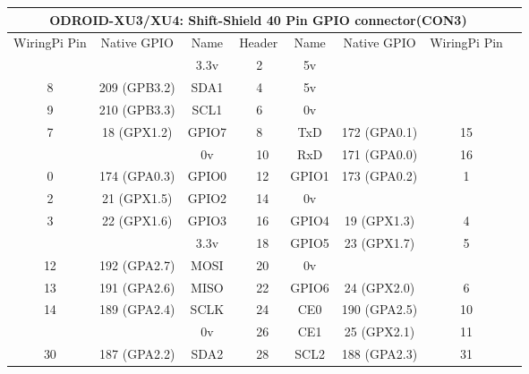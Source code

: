 \documentclass[11pt,a4paper]{article}
\begin{document}
\begin{sffamily}
\begin{center}
\begin{tabular}{|c|c|c||p{8mm}|p{8mm}||c|c|c|c|}
\hline
\multicolumn{8}{|c|}{\bfseries{ODROID-XU3/XU4: Shift-Shield 40 Pin GPIO connector(CON3)}}\\
\hline
\hline
WiringPi Pin	& Native GPIO	& Name	& \multicolumn{2}{|c||}{Header}	& Name	& Native GPIO	& WiringPi Pin\\
\hline
\hline
	& 		& \textcolor{rtb-red}{3.3v}	& \raggedleft{1} &  2 & \textcolor{rtb-maroon}{5v}	& 		& \\
\hline
8	& 209 (GPB3.2)		& \textcolor{rtb-aqua}{SDA1}	& \raggedleft{3} &  4 & \textcolor{rtb-maroon}{5v}		& 				& \\
\hline
9	& 210 (GPB3.3)		& \textcolor{rtb-aqua}{SCL1}	& \raggedleft{5} &  6 & \textcolor{rtb-black}{0v}		& 				& \\
\hline
7	& 18 (GPX1.2)		& \textcolor{rtb-green}{GPIO7}	& \raggedleft{7} &  8 & \textcolor{rtb-yellow}{TxD}		& 172 (GPA0.1)	& 15\\
\hline
	& 					& \textcolor{rtb-black}{0v}		& \raggedleft{9} & 10 & \textcolor{rtb-yellow}{RxD}		& 171 (GPA0.0)	& 16\\
\hline
0	& 174 (GPA0.3)		& \textcolor{rtb-green}{GPIO0}	& \raggedleft{11} & 12 & \textcolor{rtb-green}{GPIO1}	& 173 (GPA0.2)	& 1\\
\hline
2	& 21 (GPX1.5)		& \textcolor{rtb-green}{GPIO2}	& \raggedleft{13} & 14 & \textcolor{rtb-black}{0v}		&		 		& \\
\hline
3	& 22 (GPX1.6)		& \textcolor{rtb-green}{GPIO3}	& \raggedleft{15} & 16 & \textcolor{rtb-green}{GPIO4}	& 19 (GPX1.3)	& 4\\
\hline
	&		 			& \textcolor{rtb-red}{3.3v}		& \raggedleft{17} & 18 & \textcolor{rtb-green}{GPIO5}	& 23 (GPX1.7)	& 5\\
\hline
12	& 192 (GPA2.7)		& \textcolor{rtb-teal}{MOSI}	& \raggedleft{19} & 20 & \textcolor{rtb-black}{0v}		& 				& \\
\hline
13	& 191 (GPA2.6)		& \textcolor{rtb-teal}{MISO}	& \raggedleft{21} & 22 & \textcolor{rtb-green}{GPIO6}	& 24 (GPX2.0)	& 6\\
\hline
14	& 189 (GPA2.4)		& \textcolor{rtb-teal}{SCLK}	& \raggedleft{23} & 24 & \textcolor{rtb-teal}{CE0}		& 190 (GPA2.5)	& 10\\
\hline
	&		 			& \textcolor{rtb-black}{0v}		& \raggedleft{25} & 26 & \textcolor{rtb-teal}{CE1}		& 25 (GPX2.1)	& 11\\
\hline
30	& 187 (GPA2.2)		& \textcolor{rtb-aqua}{SDA2}	& \raggedleft{27} & 28 & \textcolor{rtb-aqua}{SCL2}		& 188 (GPA2.3)	& 31\\

\end{tabular}
\end{center}
\end{sffamily}
\end{document}
